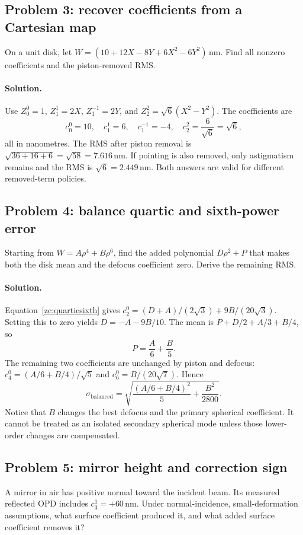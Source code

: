 \subsection*{Problem 3: recover coefficients from a Cartesian map}
On a unit disk, let
$W=(10+12X-8Y+6X^2-6Y^2)\,\mathrm{nm}$. Find all nonzero
coefficients and the piston-removed RMS.

\paragraph{Solution.}
Use $Z_0^0=1$, $Z_1^1=2X$, $Z_1^{-1}=2Y$, and
$Z_2^2=\sqrt6(X^2-Y^2)$. The coefficients are
\begin{equation}
 c_0^0=10,\quad c_1^1=6,\quad c_1^{-1}=-4,\quad
 c_2^2=\frac6{\sqrt6}=\sqrt6,
\end{equation}
all in nanometres. The RMS after piston removal is
$\sqrt{36+16+6}=\sqrt{58}=7.616\,\mathrm{nm}$.
If pointing is also removed, only astigmatism remains and the RMS is
$\sqrt6=2.449\,\mathrm{nm}$. Both answers are valid for different
removed-term policies.

\subsection*{Problem 4: balance quartic and sixth-power error}
Starting from $W=A\rho^4+B\rho^6$, find the added polynomial
$D\rho^2+P$ that makes both the disk mean and the defocus coefficient
zero. Derive the remaining RMS.

\paragraph{Solution.}
Equation~\eqref{zc:quarticsixth} gives
$c_2^0=(D+A)/(2\sqrt3)+9B/(20\sqrt3)$. Setting this to zero yields
$D=-A-9B/10$. The mean is $P+D/2+A/3+B/4$, so
\begin{equation}
 P=\frac A6+\frac B5.
\end{equation}
The remaining two coefficients are unchanged by piston and defocus:
$c_4^0=(A/6+B/4)/\sqrt5$ and $c_6^0=B/(20\sqrt7)$. Hence
\begin{equation}
 \sigma_{\mathrm{balanced}}=
 \sqrt{\frac{(A/6+B/4)^2}{5}+\frac{B^2}{2800}}.
\end{equation}
Notice that $B$ changes the best defocus and the primary spherical
coefficient. It cannot be treated as an isolated secondary spherical
mode unless those lower-order changes are compensated.

\subsection*{Problem 5: mirror height and correction sign}
A mirror in air has positive normal toward the incident beam. Its
measured reflected OPD includes $c_3^1=+60\,\mathrm{nm}$. Under
normal-incidence, small-deformation assumptions, what surface
coefficient produced it, and what added surface coefficient removes it?

